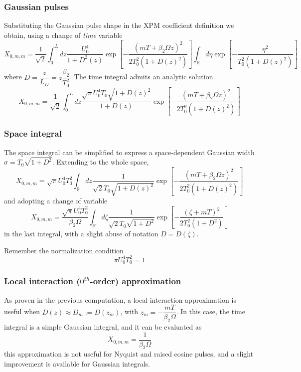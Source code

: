 \documentclass[8pt]{beamer} %
\begin{document}
\begin{frame}
  \frametitle{Gaussian pulses}
  Substituting the Gaussian pulse shape in the XPM coefficient definition we obtain, using a change of \textit{time} variable
  \begin{equation}
    X_{0, m, m}=\frac{1}{\sqrt{2}} \int_{0}^{L} d z \frac{U_{0}^{4}}{1+D^{2}(z)} \exp \left[-\frac{\left(m T+\beta_{2} \Omega z\right)^{2}}{2 T_{0}^{2}\left(1+D(z)^{2}\right)}\right] \int_{\mathbb{R}} d \eta \exp \left[-\frac{\eta^{2}}{T_{0}^{2}\left(1+D(z)^{2}\right)}\right]
  \end{equation}
where $D = \dfrac{z}{L_D} = z \dfrac{\beta_2}{T_0^2}$.
The time integral admits an analytic solution
  \begin{equation}
    X_{0, m, m}=\frac{1}{\sqrt{2}} \int_{0}^{L} d z \frac{\sqrt{\pi} U_{0}^{4} T_{0} \sqrt{1+D(z)^{2}}}{1+D(z)} \exp \left[-\frac{\left(m T+\beta_{2} \Omega z\right)^{2}}{2 T_{0}^{2}\left(1+D(z)^{2}\right)}\right]
  \end{equation}
\end{frame}

\begin{frame}
  \frametitle{Space integral}
  The space integral can be simplified to express a space-dependent Gaussian width $\sigma=T_{0}\sqrt{1+D^{2}}$. Extending to the whole space, 
  \begin{equation}
    X_{0, m, m}=\sqrt{\pi} U_{0}^{4} T_{0}^{2} \int_{\mathbb{R}} d z \frac{1}{\sqrt{2} T_{0} \sqrt{1+D(z)^{2}}} \exp \left[-\frac{\left(m T+\beta_{2} \Omega z\right)^{2}}{2 T_{0}^{2}\left(1+D(z)^{2}\right)}\right]
  \end{equation}
and adopting a change of variable
  \begin{equation}
    X_{0, m, m}=\frac{\sqrt{\pi} U_{0}^{4} T_{0}^{2}}{\beta_{2} \Omega} \int_{\mathbb{R}} d\zeta \frac{1}{\sqrt{2} T_{0} \sqrt{1+D^{2}}} \exp \left[-\frac{(\zeta+m T)^{2}}{2 T_{0}^{2}\left(1+D^{2}\right)}\right]
  \end{equation}
in the last integral, with a slight abuse of notation $D = D(\zeta)$.

Remember the normalization condition
\begin{equation}
	\pi U_{0}^{4} T_{0}^{2} = 1
\end{equation}
\end{frame}

\begin{frame}
	\frametitle{Local interaction ($0^{th}$-order) approximation}
	As proven in the previous computation, a local interaction approximation is useful when $D(z) \approx D_m := D(z_m)$, with $z_m = -\dfrac{mT}{\beta_2 \Omega}$.
	In this case, the time integral is a simple Gaussian integral, and it can be evaluated as
	\begin{equation}
		X_{0, m, m} = \dfrac{1}{\beta_2 \Omega}
	\end{equation}
	this approximation is not useful for Nyquist and raised cosine pulses, and a slight improvement is available for Gaussian integrals.
\end{frame}
\end{document}
